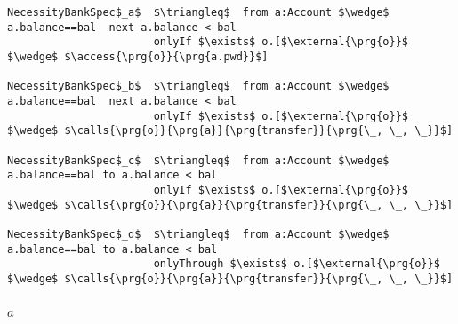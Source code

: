 \documentclass[acmsmall,review,anonymous]{acmart}\settopmatter{printfolios=true,printccs=false,printacmref=false}
\begin{document}
\begin{lstlisting}[language = Chainmail, mathescape=true, frame=lines]
NecessityBankSpec$_a$  $\triangleq$  from a:Account $\wedge$ a.balance==bal  next a.balance < bal
                       onlyIf $\exists$ o.[$\external{\prg{o}}$ $\wedge$ $\access{\prg{o}}{\prg{a.pwd}}$]                                           

NecessityBankSpec$_b$  $\triangleq$  from a:Account $\wedge$ a.balance==bal  next a.balance < bal
                       onlyIf $\exists$ o.[$\external{\prg{o}}$ $\wedge$ $\calls{\prg{o}}{\prg{a}}{\prg{transfer}}{\prg{\_, \_, \_}}$]
                       
NecessityBankSpec$_c$  $\triangleq$  from a:Account $\wedge$ a.balance==bal to a.balance < bal
                       onlyIf $\exists$ o.[$\external{\prg{o}}$ $\wedge$ $\calls{\prg{o}}{\prg{a}}{\prg{transfer}}{\prg{\_, \_, \_}}$]
                       
NecessityBankSpec$_d$  $\triangleq$  from a:Account $\wedge$ a.balance==bal to a.balance < bal
                       onlyThrough $\exists$ o.[$\external{\prg{o}}$ $\wedge$ $\calls{\prg{o}}{\prg{a}}{\prg{transfer}}{\prg{\_, \_, \_}}$]
\end{lstlisting}

\subsection{$_a$}
\end{document}
